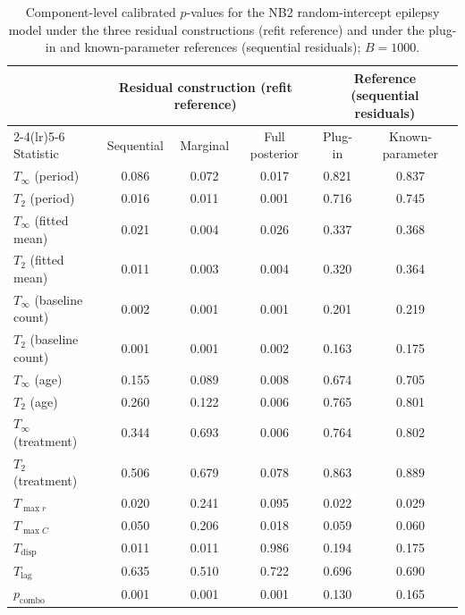 \begin{table}[htbp]
\centering
\small
\caption{Component-level calibrated $p$-values for the NB2 random-intercept epilepsy model under the three residual constructions (refit reference) and under the plug-in and known-parameter references (sequential residuals); $B=1000$.}
\label{tab:ablation-epil-components}
\begin{tabular*}{\textwidth}{@{}l@{\extracolsep{\fill}}ccccc@{}}
\toprule
 & \multicolumn{3}{c}{Residual construction (refit reference)} & \multicolumn{2}{c}{Reference (sequential residuals)} \\
\cmidrule(lr){2-4}\cmidrule(lr){5-6}
Statistic & Sequential & Marginal & Full posterior & Plug-in & Known-parameter \\
\midrule
$T_{\infty}$ (period) & 0.086 & 0.072 & 0.017 & 0.821 & 0.837 \\
$T_{2}$ (period) & 0.016 & 0.011 & 0.001 & 0.716 & 0.745 \\
$T_{\infty}$ (fitted mean) & 0.021 & 0.004 & 0.026 & 0.337 & 0.368 \\
$T_{2}$ (fitted mean) & 0.011 & 0.003 & 0.004 & 0.320 & 0.364 \\
$T_{\infty}$ (baseline count) & 0.002 & 0.001 & 0.001 & 0.201 & 0.219 \\
$T_{2}$ (baseline count) & 0.001 & 0.001 & 0.002 & 0.163 & 0.175 \\
$T_{\infty}$ (age) & 0.155 & 0.089 & 0.008 & 0.674 & 0.705 \\
$T_{2}$ (age) & 0.260 & 0.122 & 0.006 & 0.765 & 0.801 \\
$T_{\infty}$ (treatment) & 0.344 & 0.693 & 0.006 & 0.764 & 0.802 \\
$T_{2}$ (treatment) & 0.506 & 0.679 & 0.078 & 0.863 & 0.889 \\
$T_{\max r}$ & 0.020 & 0.241 & 0.095 & 0.022 & 0.029 \\
$T_{\max C}$ & 0.050 & 0.206 & 0.018 & 0.059 & 0.060 \\
$T_{\mathrm{disp}}$ & 0.011 & 0.011 & 0.986 & 0.194 & 0.175 \\
$T_{\mathrm{lag}}$ & 0.635 & 0.510 & 0.722 & 0.696 & 0.690 \\
\midrule
$p_{\mathrm{combo}}$ & 0.001 & 0.001 & 0.001 & 0.130 & 0.165 \\
\bottomrule
\end{tabular*}
\end{table}

